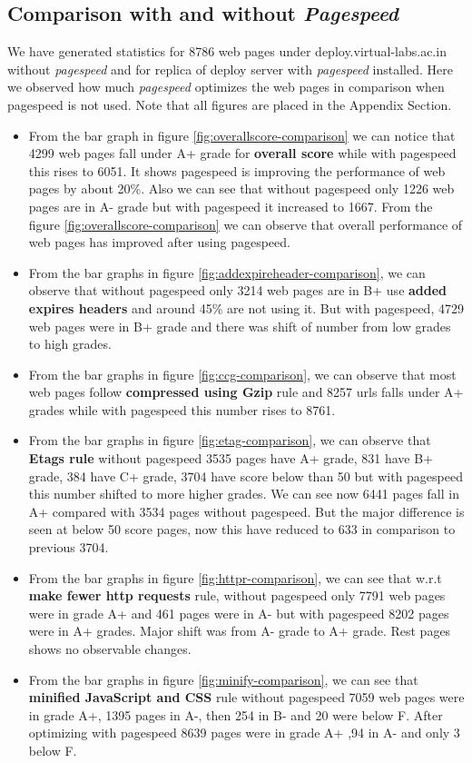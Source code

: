 \documentclass[conference]{IEEEtran}
\begin{document}
\subsection{Comparison with and without {\it Pagespeed}}\label{sec-6.2}
We have generated statistics for 8786 web pages under
deploy.virtual-labs.ac.in without {\it pagespeed} and for replica of deploy server with {\it pagespeed}
installed. Here we observed how much {\it pagespeed} optimizes the web pages in comparison
when pagespeed is not used. Note that all figures are placed in the Appendix Section.
\begin{itemize}
\item From the bar graph in figure \ref{fig:overallscore-comparison} we can notice that 4299 web pages fall under
A+ grade for \textbf{overall score} while with pagespeed this rises to 6051. It
shows pagespeed is improving the performance of web pages by about 20\%. Also
we can see that without pagespeed only 1226 web pages are in A- grade but with
pagespeed it increased to 1667. From the figure \ref{fig:overallscore-comparison} we can observe that overall
performance of web pages has improved after using pagespeed.

\item From the bar graphs in figure \ref{fig:addexpireheader-comparison}, we can observe that without pagespeed only 3214
web pages are in B+  use \textbf{added expires headers} and around
45\% are not using it. But with pagespeed, 4729 web pages were in B+ grade and
there was shift of number from low grades to high grades.

\item From the bar graphs in figure \ref{fig:ccg-comparison}, we can observe that most web pages follow \textbf{compressed
using Gzip} rule and 8257 urls falls under A+ grades while with pagespeed this number rises to 8761.

\item From the bar graphs in figure \ref{fig:etag-comparison},
we can observe that \textbf{Etags rule} without pagespeed
3535 pages have A+ grade, 831 have B+ grade, 384 have C+ grade, 3704 have score
below than 50 but with pagespeed this number shifted to more higher grades. We can
see now 6441 pages fall in  A+ compared with 3534 pages without pagespeed. But the major difference is seen
at below 50 score pages, now this have reduced to 633 in comparison to previous
3704.

\item From the bar graphs in figure \ref{fig:httpr-comparison}, we can see that w.r.t \textbf{make fewer http
requests} rule, without pagespeed only 7791 web pages were in grade A+ and 461 pages
were in A- but with pagespeed 8202 pages were in A+ grades. Major shift was from 
A- grade to A+ grade. Rest pages shows no observable changes.

\item From the bar graphs in figure \ref{fig:minify-comparison}, we can see that \textbf{minified JavaScript and CSS} rule
without pagespeed 7059 web pages were in grade A+, 1395 pages in A-, then 254 in
B- and 20 were below F. After optimizing with pagespeed 8639 pages were in grade A+ ,94 in A- and only 3 below F.
\end{itemize}
\end{document}
